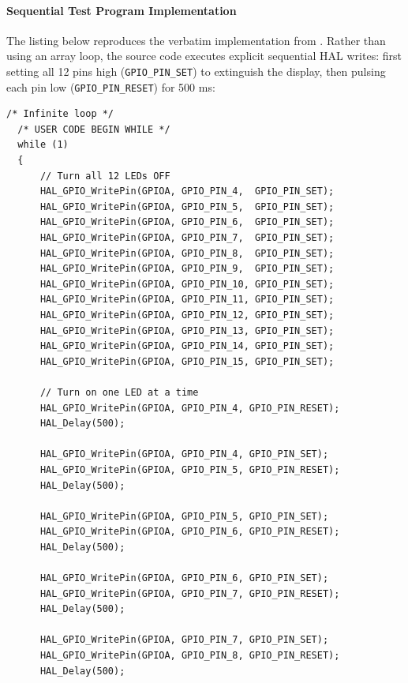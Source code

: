 \documentclass[oneside,final]{hcmut-report}
\begin{document}
\paragraph{Sequential Test Program Implementation}
The listing below reproduces the verbatim implementation from . Rather than using an array loop, the source code executes explicit sequential HAL writes: first setting all 12 pins high (\texttt{GPIO\_PIN\_SET}) to extinguish the display, then pulsing each pin low (\texttt{GPIO\_PIN\_RESET}) for 500 ms:

\begin{lstlisting}[caption={[Sequential LED test program]{Sequential LED test program (Lab1\_e6/Core/Src/main.c)}},label={lst:ex6_code},basicstyle=\fontsize{6.4pt}{7.0pt}\ttfamily,lineskip=0pt,aboveskip=1pt,belowskip=1pt]
  /* Infinite loop */
  /* USER CODE BEGIN WHILE */
  while (1)
  {
      // Turn all 12 LEDs OFF
      HAL_GPIO_WritePin(GPIOA, GPIO_PIN_4,  GPIO_PIN_SET);
      HAL_GPIO_WritePin(GPIOA, GPIO_PIN_5,  GPIO_PIN_SET);
      HAL_GPIO_WritePin(GPIOA, GPIO_PIN_6,  GPIO_PIN_SET);
      HAL_GPIO_WritePin(GPIOA, GPIO_PIN_7,  GPIO_PIN_SET);
      HAL_GPIO_WritePin(GPIOA, GPIO_PIN_8,  GPIO_PIN_SET);
      HAL_GPIO_WritePin(GPIOA, GPIO_PIN_9,  GPIO_PIN_SET);
      HAL_GPIO_WritePin(GPIOA, GPIO_PIN_10, GPIO_PIN_SET);
      HAL_GPIO_WritePin(GPIOA, GPIO_PIN_11, GPIO_PIN_SET);
      HAL_GPIO_WritePin(GPIOA, GPIO_PIN_12, GPIO_PIN_SET);
      HAL_GPIO_WritePin(GPIOA, GPIO_PIN_13, GPIO_PIN_SET);
      HAL_GPIO_WritePin(GPIOA, GPIO_PIN_14, GPIO_PIN_SET);
      HAL_GPIO_WritePin(GPIOA, GPIO_PIN_15, GPIO_PIN_SET);

      // Turn on one LED at a time
      HAL_GPIO_WritePin(GPIOA, GPIO_PIN_4, GPIO_PIN_RESET);
      HAL_Delay(500);

      HAL_GPIO_WritePin(GPIOA, GPIO_PIN_4, GPIO_PIN_SET);
      HAL_GPIO_WritePin(GPIOA, GPIO_PIN_5, GPIO_PIN_RESET);
      HAL_Delay(500);

      HAL_GPIO_WritePin(GPIOA, GPIO_PIN_5, GPIO_PIN_SET);
      HAL_GPIO_WritePin(GPIOA, GPIO_PIN_6, GPIO_PIN_RESET);
      HAL_Delay(500);

      HAL_GPIO_WritePin(GPIOA, GPIO_PIN_6, GPIO_PIN_SET);
      HAL_GPIO_WritePin(GPIOA, GPIO_PIN_7, GPIO_PIN_RESET);
      HAL_Delay(500);

      HAL_GPIO_WritePin(GPIOA, GPIO_PIN_7, GPIO_PIN_SET);
      HAL_GPIO_WritePin(GPIOA, GPIO_PIN_8, GPIO_PIN_RESET);
      HAL_Delay(500);


\end{lstlisting}
\end{document}
